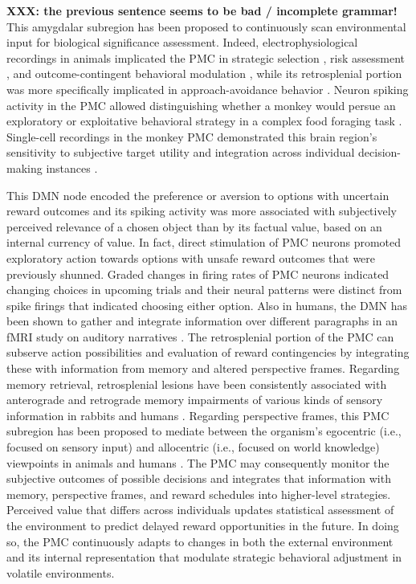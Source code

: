 \documentclass[10pt,letterpaper]{article}
\begin{document}
\textbf{XXX: the previous sentence seems to be bad / incomplete grammar!}
This amygdalar subregion has been proposed to
continuously scan environmental input
for biological significance assessment.
%
Indeed,
electrophysiological recordings in animals implicated the PMC in
strategic selection \citep{pearson2009neurons},
risk assessment \citep{mccoy2005risk},
and outcome-contingent behavioral modulation \citep{hayden2009electrophysiological},
while its retrosplenial portion was
more specifically implicated in approach-avoidance behavior
\citep{vann2009does}.
Neuron spiking activity in the PMC allowed distinguishing
whether a monkey would persue an exploratory or exploitative
behavioral strategy in a complex food foraging task \citep{pearson2009neurons}.
Single-cell recordings in the monkey PMC
demonstrated this brain region's sensitivity to
subjective target utility \citep{mccoy2005risk} and integration
across individual decision-making instances \citep{pearson2009neurons}.

This DMN node encoded the
preference or aversion to options with uncertain reward outcomes
and its spiking activity was more associated with
subjectively perceived relevance of a chosen object
than by its factual value, based on an internal currency of value.
In fact, direct stimulation of PMC neurons
promoted exploratory action towards options
with unsafe reward outcomes that were previously shunned.
Graded changes in firing rates of PMC neurons
indicated changing choices in upcoming trials and their neural patterns were
distinct from spike firings that indicated choosing either option.
Also in humans,
the DMN has been shown to gather and integrate information
over different paragraphs in an fMRI study on auditory narratives
\citep{simony2016dynamic}.
%
The retrosplenial portion of the PMC can subserve action possibilities
and evaluation of reward contingencies by integrating these with
information from memory and altered perspective frames.
Regarding memory retrieval, retrosplenial lesions have been
consistently associated with anterograde and retrograde memory impairments
of various kinds of sensory information
in rabbits and humans
\citep{vann2009does}.
Regarding perspective frames, this PMC subregion has been
proposed to mediate between the organism's egocentric
(i.e., focused on sensory input) and
allocentric (i.e., focused on world knowledge) viewpoints
in animals and humans
\citep{epstein2008parahippocampal, burgess2008spatial, valiquette2007different}.
%
The PMC may consequently monitor the subjective outcomes
of possible decisions and integrates that information
with memory, perspective frames, and
reward schedules into higher-level strategies.
Perceived value that differs across individuals updates
statistical assessment of the environment
to predict delayed reward opportunities in the future.
In doing so, the PMC continuously adapts to changes
in both the external environment and its internal representation
that modulate strategic behavioral adjustment in volatile environments.
\end{document}
